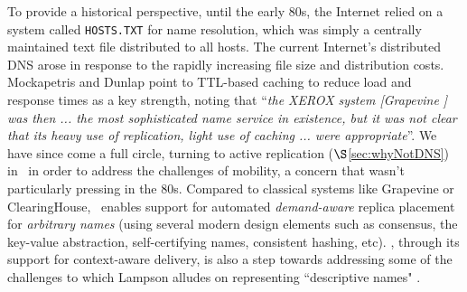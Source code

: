 To provide a historical perspective, until the early 80s, the Internet relied on a system called \verb+HOSTS.TXT+ for name resolution, which was simply a centrally maintained text file distributed to all hosts. The current Internet's distributed DNS  arose in response to the rapidly increasing file size and distribution costs. Mockapetris and Dunlap \cite{DNS} point to TTL-based caching to reduce load and response times as a key strength, noting that ``{\em{the XEROX system {\em [Grapevine \cite{grapevine}]} was then ... the most sophisticated name service in existence, but it was not clear that its heavy use of replication, light use of caching ... were appropriate}}''. We have since come a full circle, turning to  active replication ($\S$\ref{sec:whyNotDNS}) in \auspice\ in order to address the challenges of mobility, a concern that wasn't particularly pressing  in the 80s. Compared to classical systems like Grapevine or ClearingHouse, \auspice\ enables support for automated {\em demand-aware} replica placement for {\em arbitrary names} (using several modern design elements such as consensus, the key-value abstraction, self-certifying names, consistent hashing, etc).  \auspice, through its support for context-aware delivery, is also a step towards addressing some of the challenges to which Lampson alludes on representing ``descriptive names" \cite{Lampson}.




